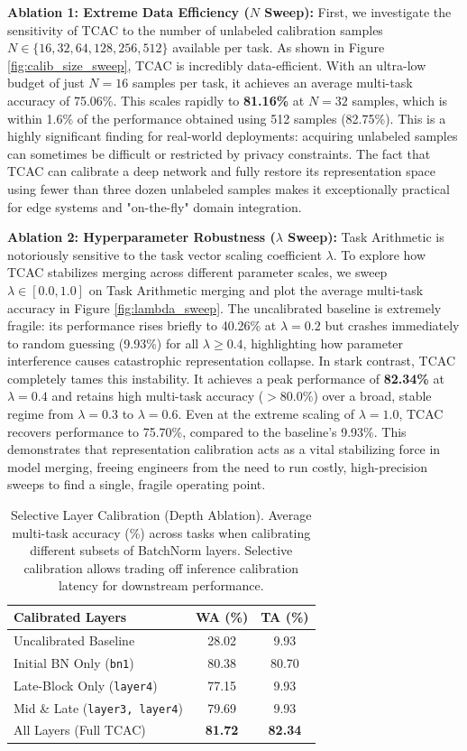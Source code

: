 \documentclass{article}
\theoremstyle{plain}
\theoremstyle{definition}
\theoremstyle{remark}
\begin{document}
\textbf{Ablation 1: Extreme Data Efficiency ($N$ Sweep):}
First, we investigate the sensitivity of TCAC to the number of unlabeled calibration samples $N \in \{16, 32, 64, 128, 256, 512\}$ available per task. As shown in Figure \ref{fig:calib_size_sweep}, TCAC is incredibly data-efficient. With an ultra-low budget of just $N = 16$ samples per task, it achieves an average multi-task accuracy of 75.06\%. This scales rapidly to \textbf{81.16\%} at $N = 32$ samples, which is within 1.6\% of the performance obtained using 512 samples (82.75\%). 
This is a highly significant finding for real-world deployments: acquiring unlabeled samples can sometimes be difficult or restricted by privacy constraints. The fact that TCAC can calibrate a deep network and fully restore its representation space using fewer than three dozen unlabeled samples makes it exceptionally practical for edge systems and "on-the-fly" domain integration.

\textbf{Ablation 2: Hyperparameter Robustness ($\lambda$ Sweep):}
Task Arithmetic is notoriously sensitive to the task vector scaling coefficient $\lambda$. To explore how TCAC stabilizes merging across different parameter scales, we sweep $\lambda \in [0.0, 1.0]$ on Task Arithmetic merging and plot the average multi-task accuracy in Figure \ref{fig:lambda_sweep}.
The uncalibrated baseline is extremely fragile: its performance rises briefly to 40.26\% at $\lambda = 0.2$ but crashes immediately to random guessing (9.93\%) for all $\lambda \geq 0.4$, highlighting how parameter interference causes catastrophic representation collapse. 
In stark contrast, TCAC completely tames this instability. It achieves a peak performance of \textbf{82.34\%} at $\lambda = 0.4$ and retains high multi-task accuracy ($>80.0\%$) over a broad, stable regime from $\lambda = 0.3$ to $\lambda = 0.6$. Even at the extreme scaling of $\lambda = 1.0$, TCAC recovers performance to 75.70\%, compared to the baseline's 9.93\%. This demonstrates that representation calibration acts as a vital stabilizing force in model merging, freeing engineers from the need to run costly, high-precision sweeps to find a single, fragile operating point.

\begin{table}[t]
\centering
\caption{Selective Layer Calibration (Depth Ablation). Average multi-task accuracy (\%) across tasks when calibrating different subsets of BatchNorm layers. Selective calibration allows trading off inference calibration latency for downstream performance.}
\label{tab:depth_ablation}
\begin{tabular}{lcc}
\toprule
\textbf{Calibrated Layers} & \textbf{WA (\%)} & \textbf{TA (\%)} \\
\midrule
Uncalibrated Baseline & 28.02 & 9.93 \\
Initial BN Only (\texttt{bn1}) & 80.38 & 80.70 \\
Late-Block Only (\texttt{layer4}) & 77.15 & 9.93 \\
Mid \& Late (\texttt{layer3, layer4}) & 79.69 & 9.93 \\
All Layers (Full TCAC) & \textbf{81.72} & \textbf{82.34} \\
\bottomrule
\end{tabular}
\end{table}
\end{document}
